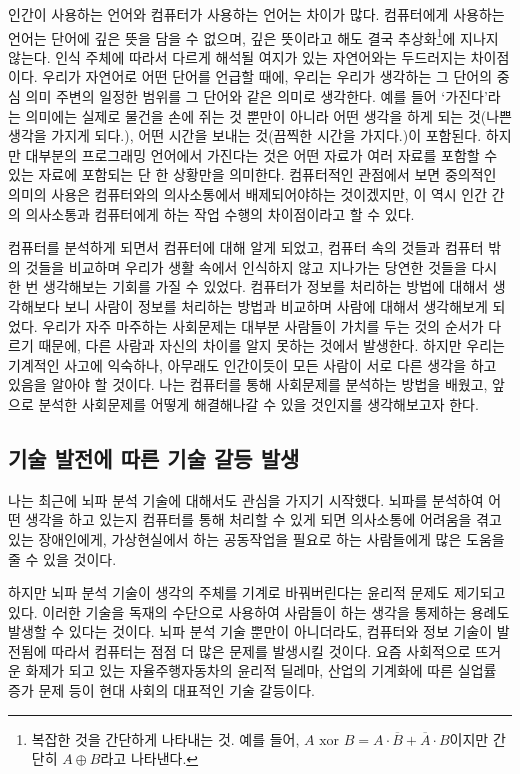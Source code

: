\documentclass{article}
\begin{document}
인간이 사용하는 언어와 컴퓨터가 사용하는 언어는 차이가 많다.
컴퓨터에게 사용하는 언어는 단어에 깊은 뜻을 담을 수 없으며, 깊은 뜻이라고 해도 결국
추상화\footnote{복잡한 것을 간단하게 나타내는 것. 예를 들어,
$A \text{ xor } B = A \cdot \overline B + \overline A \cdot B$이지만
간단히 $A \oplus B$라고 나타낸다.}에 지나지 않는다.
인식 주체에 따라서 다르게 해석될 여지가 있는 자연어와는 두드러지는 차이점이다.
우리가 자연어로 어떤 단어를 언급할 때에, 우리는 우리가 생각하는 그 단어의 중심 의미 주변의 일정한
범위를 그 단어와 같은 의미로 생각한다. 예를 들어 `가진다'라는 의미에는 실제로 물건을 손에 쥐는 것
뿐만이 아니라 어떤 생각을 하게 되는 것(나쁜 생각을 가지게 되다.),
어떤 시간을 보내는 것(끔찍한 시간을 가지다.)이 포함된다.
하지만 대부분의 프로그래밍 언어에서 가진다는 것은 어떤 자료가 여러 자료를 포함할 수 있는 자료에
포함되는 단 한 상황만을 의미한다.
컴퓨터적인 관점에서 보면 중의적인 의미의 사용은 컴퓨터와의 의사소통에서 배제되어야하는 것이겠지만,
이 역시 인간 간의 의사소통과 컴퓨터에게 하는 작업 수행의 차이점이라고 할 수 있다.


컴퓨터를 분석하게 되면서 컴퓨터에 대해 알게 되었고, 컴퓨터 속의 것들과 컴퓨터 밖의 것들을 비교하며
우리가 생활 속에서 인식하지 않고 지나가는 당연한 것들을 다시 한 번 생각해보는 기회를 가질 수
있었다.
컴퓨터가 정보를 처리하는 방법에 대해서 생각해보다 보니 사람이 정보를 처리하는 방법과
비교하며 사람에 대해서 생각해보게 되었다.
우리가 자주 마주하는 사회문제는 대부분 사람들이 가치를 두는 것의 순서가 다르기 때문에,
다른 사람과 자신의 차이를 알지 못하는 것에서 발생한다.
하지만 우리는 기계적인 사고에 익숙하나, 아무래도 인간이듯이 모든 사람이 서로 다른 생각을 하고 있음을
알아야 할 것이다.
나는 컴퓨터를 통해 사회문제를 분석하는 방법을 배웠고, 앞으로 분석한 사회문제를 어떻게 해결해나갈
수 있을 것인지를 생각해보고자 한다.

\subsection{기술 발전에 따른 기술 갈등 발생}

나는 최근에 뇌파 분석 기술에 대해서도 관심을 가지기 시작했다.
뇌파를 분석하여 어떤 생각을 하고 있는지 컴퓨터를 통해 처리할 수 있게 되면
의사소통에 어려움을 겪고 있는 장애인에게, 가상현실에서 하는 공동작업을 필요로 하는 사람들에게
많은 도움을 줄 수 있을 것이다.

하지만 뇌파 분석 기술이 생각의 주체를 기계로 바꿔버린다는 윤리적 문제도 제기되고 있다.
이러한 기술을 독재의 수단으로 사용하여 사람들이 하는 생각을 통제하는 용례도 발생할 수 있다는 것이다.
뇌파 분석 기술 뿐만이 아니더라도, 컴퓨터와 정보 기술이 발전됨에 따라서 컴퓨터는 점점
더 많은 문제를 발생시킬 것이다.
요즘 사회적으로 뜨거운 화제가 되고 있는 자율주행자동차의 윤리적 딜레마,
산업의 기계화에 따른 실업률 증가 문제 등이 현대 사회의 대표적인 기술 갈등이다.
\end{document}
